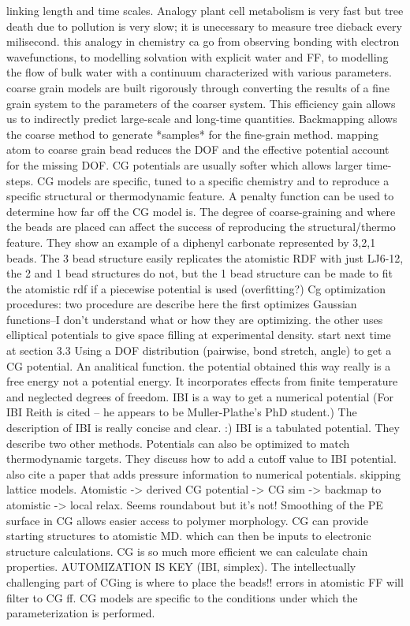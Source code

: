 \documentclass{article}
\begin{document}
linking length and time scales. Analogy plant cell metabolism is very fast but tree death due to pollution is very slow; it is unecessary to measure tree dieback every milisecond. this analogy in chemistry ca go from observing bonding with electron wavefunctions, to modelling solvation with explicit water and FF, to modelling the flow of bulk water with a continuum characterized with various parameters. coarse grain models are built rigorously through converting the results of a fine grain system to the parameters of the coarser system. This efficiency gain allows us to indirectly predict large-scale and long-time quantities. 
Backmapping allows the coarse method to generate *samples* for the fine-grain method.
mapping atom to coarse grain bead reduces the DOF and the effective potential account for the missing DOF. CG potentials are usually softer which allows larger time-steps. CG models are specific, tuned to a specific chemistry and to reproduce a specific structural or thermodynamic feature. 
A penalty function can be used to determine how far off the CG model is.
The degree of coarse-graining and where the beads are placed can affect the success of reproducing the structural/thermo feature. They show an example of a diphenyl carbonate represented by 3,2,1 beads. The 3 bead structure easily replicates the atomistic RDF with just LJ6-12, the 2 and 1 bead structures do not, but the 1 bead structure can be made to fit the atomistic rdf if a piecewise potential is used (overfitting?)
Cg optimization procedures: two procedure are describe here the first optimizes Gaussian functions--I don't understand what or how they are optimizing. the other uses elliptical potentials to give space filling at experimental density.
start next time at section 3.3
Using a DOF distribution (pairwise, bond stretch, angle) to get a CG potential. An analitical function. the potential obtained this way really is a free energy not a potential energy. It incorporates effects from finite temperature and neglected degrees of freedom.
IBI is a way to get a numerical potential (For IBI Reith is cited -- he appears to be Muller-Plathe's PhD student.) The description of IBI is really concise and clear. :) IBI is a tabulated potential. They describe two other methods.
Potentials can also be optimized to match thermodynamic targets. They discuss how to add a cutoff value to IBI potential. also cite a paper that adds pressure information to numerical potentials.
skipping lattice models.
Atomistic -> derived CG potential -> CG sim -> backmap to atomistic -> local relax. 
Seems roundabout but it's not! Smoothing of the PE surface in CG allows easier access to polymer morphology. CG can provide starting structures to atomistic MD. which can then be inputs to electronic structure calculations. 
CG is so much more efficient we can calculate chain properties. AUTOMIZATION IS KEY (IBI, simplex). The intellectually challenging part of CGing is where to place the beads!!
errors in atomistic FF will filter to CG ff.
CG models are specific to the conditions under which the parameterization is performed.
\end{document}

